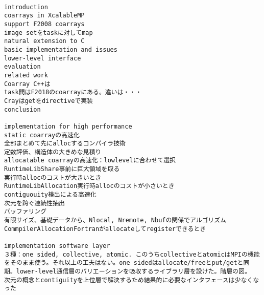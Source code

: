 \begin{verbatim}

introduction
coarrays in XcalableMP
support F2008 coarrays
image setをtaskに対してmap
natural extension to C
basic implementation and issues
lower-level interface
evaluation
related work
Coarray C++は
task間はF2018のcoarrayにある。違いは・・・
Crayはgetをdirectiveで実装
conclusion

implementation for high performance
static coarrayの高速化
全部まとめて先にallocするコンパイラ技術
定数評価、構造体の大きめな見積り
allocatable coarrayの高速化：lowlevelに合わせて選択
RuntimeLibShare事前に巨大領域を取る
実行時allocのコストが大きいとき
RuntimeLibAllocation実行時allocのコストが小さいとき
contiguouity検出による高速化
次元を跨ぐ連続性抽出
バッファリング
有限サイズ、基礎データから、Nlocal, Nremote, Nbufの関係でアルゴリズム
CommpilerAllocationFortranがallocateしてregisterできるとき

implementation software layer
３種：one sided, collective, atomic. このうちcollectiveとatomicはMPIの機能をそのまま使う。それ以上の工夫はない。one sidedはallocate/freeとput/getと同期。lower-level通信層のバリエーションを吸収するライブラリ層を設けた。階層の図。
次元の概念とcontiguityを上位層で解決するため結果的に必要なインタフェースは少なくなった



\end{verbatim}
